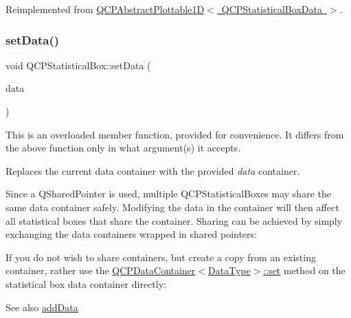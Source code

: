 Reimplemented from \mbox{\hyperlink{class_q_c_p_abstract_plottable1_d_a22377bf6e57ab7eedbc9e489250c6ded}{Q\+C\+P\+Abstract\+Plottable1\+D$<$ Q\+C\+P\+Statistical\+Box\+Data $>$}}.

\mbox{\label{class_q_c_p_statistical_box_a08a6da55822bad825ee25a8069b9b52f}} 
\subsubsection{\texorpdfstring{setData()}{setData()}\hspace{0.1cm}{\footnotesize\ttfamily [1/2]}}
{\footnotesize\ttfamily void Q\+C\+P\+Statistical\+Box\+::set\+Data (\begin{DoxyParamCaption}\item[{Q\+Shared\+Pointer$<$ \mbox{\hyperlink{qcustomplot_8h_a8b773c0c35f8f924701ced6e9915e4c7}{Q\+C\+P\+Statistical\+Box\+Data\+Container}} $>$}]{data }\end{DoxyParamCaption})}

This is an overloaded member function, provided for convenience. It differs from the above function only in what argument(s) it accepts.

Replaces the current data container with the provided {\itshape data} container.

Since a Q\+Shared\+Pointer is used, multiple Q\+C\+P\+Statistical\+Boxes may share the same data container safely. Modifying the data in the container will then affect all statistical boxes that share the container. Sharing can be achieved by simply exchanging the data containers wrapped in shared pointers\+: 
\begin{DoxyCodeInclude}{0}
\end{DoxyCodeInclude}
 If you do not wish to share containers, but create a copy from an existing container, rather use the \mbox{\hyperlink{class_q_c_p_data_container_ae7042bd534fc3ce7befa2ce3f790b5bf}{Q\+C\+P\+Data\+Container$<$\+Data\+Type$>$\+::set}} method on the statistical box data container directly\+: 
\begin{DoxyCodeInclude}{0}
\end{DoxyCodeInclude}
 \begin{DoxySeeAlso}{See also}
\mbox{\hyperlink{class_q_c_p_statistical_box_a9a8739c5b8291db8fd839e892fc8f478}{add\+Data}} 
\end{DoxySeeAlso}
\mbox{\label{class_q_c_p_statistical_box_a4ae198e66243d8cc57ad8893c37bf9d4}} 
